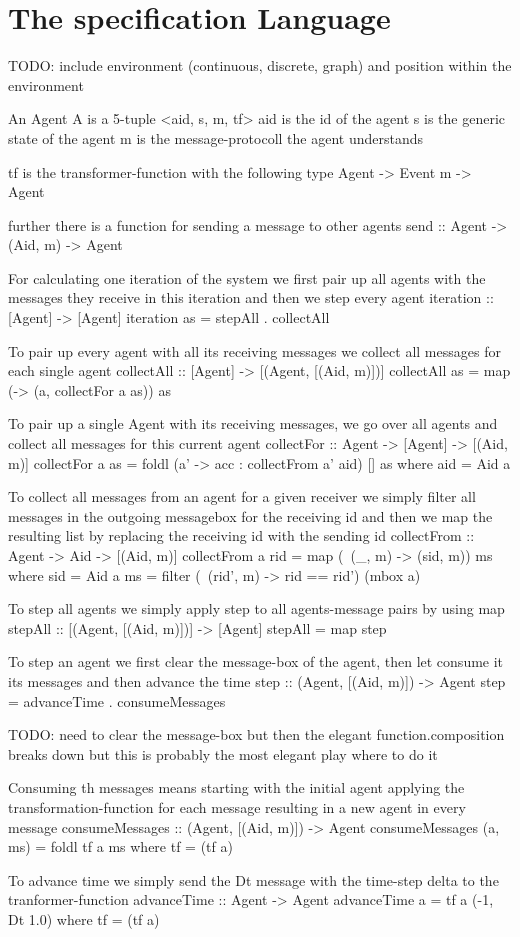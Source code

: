\section{The specification Language}

TODO: include environment (continuous, discrete, graph) and position within the environment

An Agent A is a 5-tuple <aid, s, m, tf>
aid is the id of the agent
s is the generic state of the agent
m is the message-protocoll the agent understands 


tf is the transformer-function with the following type Agent -> Event m -> Agent



further there is a function for sending a message to other agents
send :: Agent -> (Aid, m) -> Agent

For calculating one iteration of the system we first pair up all agents with the messages they receive in this iteration and then we step every agent
iteration :: [Agent] -> [Agent]
iteration as = stepAll . collectAll

To pair up every agent with all its receiving messages we collect all messages for each single agent
collectAll :: [Agent] -> [(Agent, [(Aid, m)])]
collectAll as = map (\a -> (a, collectFor a as)) as

To pair up a single Agent with its receiving messages, we go over all agents and collect all messages for this current agent
collectFor :: Agent -> [Agent] -> [(Aid, m)]
collectFor a as = foldl (\acc a' -> acc : collectFrom a' aid) [] as
	where
		aid = Aid a

To collect all messages from an agent for a given receiver we simply filter all messages in the outgoing messagebox for the receiving id and then we map the resulting list by replacing the receiving id with the sending id
collectFrom :: Agent -> Aid -> [(Aid, m)]
collectFrom a rid = map (\ (_, m) -> (sid, m)) ms
	where
		sid = Aid a
		ms = filter (\ (rid', m) -> rid == rid') (mbox a)

To step all agents we simply apply step to all agents-message pairs by using map
stepAll :: [(Agent, [(Aid, m)])] -> [Agent]
stepAll = map step

To step an agent we first clear the message-box of the agent, then let consume it its messages and then advance the time 
step :: (Agent, [(Aid, m)]) -> Agent
step = advanceTime . consumeMessages 

TODO: need to clear the message-box but then the elegant function.composition breaks down but this is probably the most elegant play where to do it

Consuming th messages means starting with the initial agent applying the transformation-function for each message resulting in a new agent in every message
consumeMessages :: (Agent, [(Aid, m)]) -> Agent
consumeMessages (a, ms) = foldl tf a ms
	where
		tf = (tf a)

To advance time we simply send the Dt message with the time-step delta to the tranformer-function
advanceTime :: Agent -> Agent
advanceTime a = tf a (-1, Dt 1.0)
	where
		tf = (tf a)